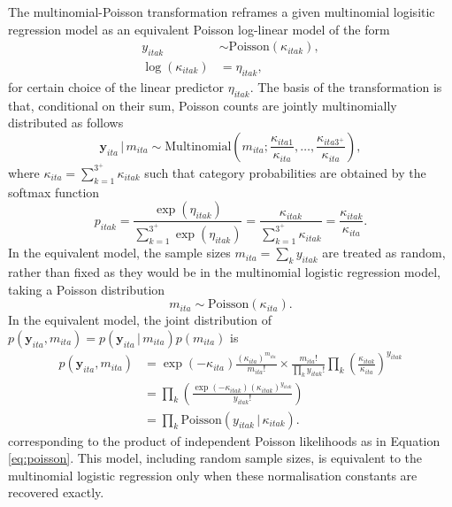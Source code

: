 \documentclass[a4paper, nobind]{templates/ociamthesis}
\begin{document}
The multinomial-Poisson transformation reframes a given multinomial logisitic regression model as an equivalent Poisson log-linear model of the form
\begin{align}
    y_{itak} &\sim \text{Poisson}(\kappa_{itak}), \label{eq:poisson} \\
    \log(\kappa_{itak}) &= \eta_{itak},
\end{align}
for certain choice of the linear predictor \(\eta_{itak}\).
The basis of the transformation is that, conditional on their sum, Poisson counts are jointly multinomially distributed \autocite{mccullagh1989generalized} as follows
\begin{equation}
    \mathbf{y}_{ita} \, | \, m_{ita} \sim \text{Multinomial} \left( m_{ita}; \frac{\kappa_{ita1}}{\kappa_{ita}}, \ldots, \frac{\kappa_{ita3^{+}}}{\kappa_{ita}} \right),
\end{equation}
where \(\kappa_{ita} = \sum_{k = 1}^{3^{+}} \kappa_{itak}\) such that category probabilities are obtained by the softmax function
\begin{equation}
    p_{itak} = \frac{\exp(\eta_{itak})}{\sum_{k = 1}^{3^{+}} \exp(\eta_{itak})} = \frac{\kappa_{itak}}{\sum_{k = 1}^{3^{+}} \kappa_{itak}} = \frac{\kappa_{itak}}{\kappa_{ita}}.
\end{equation}
In the equivalent model, the sample sizes \(m_{ita} = \sum_k y_{itak}\) are treated as random, rather than fixed as they would be in the multinomial logistic regression model, taking a Poisson distribution
\begin{equation}
    m_{ita} \sim \text{Poisson} \left( \kappa_{ita} \right).
\end{equation}
In the equivalent model, the joint distribution of \(p(\mathbf{y}_{ita}, m_{ita}) = p(\mathbf{y}_{ita} \, | \, m_{ita})p(m_{ita})\) is
\begin{align}
p(\mathbf{y}_{ita}, m_{ita}) &= \exp(-\kappa_{ita}) \frac{(\kappa_{ita})^{m_{ita}}}{m_{ita}!} \times \frac{m_{ita}!}{\prod_k y_{itak}!} \prod_k \left( \frac{\kappa_{itak}}{\kappa_{ita}} \right)^{y_{itak}} \\
&= \prod_k \left( \frac{\exp(-\kappa_{itak}) \left( \kappa_{itak} \right)^{y_{itak}}}{y_{itak}!} \right) \\
&= \prod_k \text{Poisson} \left( y_{itak} \, | \, \kappa_{itak} \right). \label{eq:prodpoisson}
\end{align}
corresponding to the product of independent Poisson likelihoods as in Equation \ref{eq:poisson}.
This model, including random sample sizes, is equivalent to the multinomial logistic regression only when these normalisation constants are recovered exactly.
\end{document}
